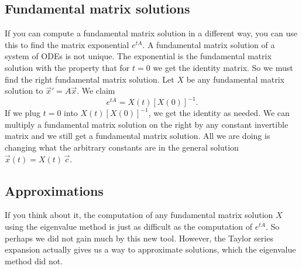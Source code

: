 \subsection{Fundamental matrix solutions}

If you can compute a fundamental matrix solution
in a different way, you can use this to find the matrix exponential $e^{tA}$.
A fundamental matrix solution of a system of ODEs is not unique.  The
exponential is the fundamental matrix solution with the property that
for $t=0$ we get the identity matrix.  So we
must find the right fundamental matrix solution.  Let $X$ be any fundamental
matrix solution to ${\vec{x}}' = A \vec{x}$.  We claim
\begin{equation*}
e^{tA} = X(t) \left[ X(0) \right]^{-1} .
\end{equation*}
If we plug $t=0$ into 
$X(t) \left[ X(0) \right]^{-1}$, we get the identity as needed.
We can multiply a fundamental matrix solution on the right by any
constant invertible matrix and we still get a fundamental matrix solution.
All we are doing is changing what the arbitrary constants are in the general
solution $\vec{x}(t) = X(t)\, \vec{c}$.

\subsection{Approximations}

If you think about it, the computation of any fundamental matrix solution
$X$ using the eigenvalue method is
just as difficult as the computation of $e^{tA}$.
So perhaps we did not gain
much by this new tool.  However, the Taylor series expansion actually gives
us a way to approximate solutions, which the eigenvalue method did
not.

